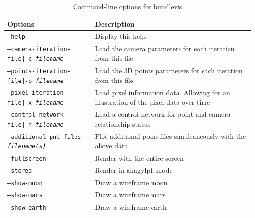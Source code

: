 \begin{longtable}{|l|p{10cm}|}
\caption{Command-line options for bundlevis}
\label{tbl:bundlevis}
\endfirsthead
\endhead
\endfoot
\endlastfoot
\hline
Options & Description \\ \hline \hline
\texttt{--help} & Display this help \\ \hline
\texttt{--camera-iteration-file|-c \textit{filename}} & Load the camera parameters for each iteration from this file \\ \hline
\texttt{--points-iteration-file|-p \textit{filename}} & Load the 3D points parameters for each iteration from this file \\ \hline
\texttt{--pixel-iteration-file|-x \textit{filename}} & Load pixel information data. Allowing for an illustration of the pixel data over time \\ \hline
\texttt{--control-network-file|-n \textit{filename}} & Load a control network for point and camera relationship status \\ \hline
\texttt{--additional-pnt-files \textit{filename(s)}} & Plot additional point files simultaneously with the above data \\ \hline
\texttt{--fullscreen} & Render with the entire screen \\ \hline
\texttt{--stereo} & Render in anagylph mode \\ \hline
\texttt{--show-moon} & Draw a wireframe moon \\ \hline
\texttt{--show-mars} & Draw a wireframe mars \\ \hline
\texttt{--show-earth} & Draw a wireframe earth \\ \hline
\end{longtable}









